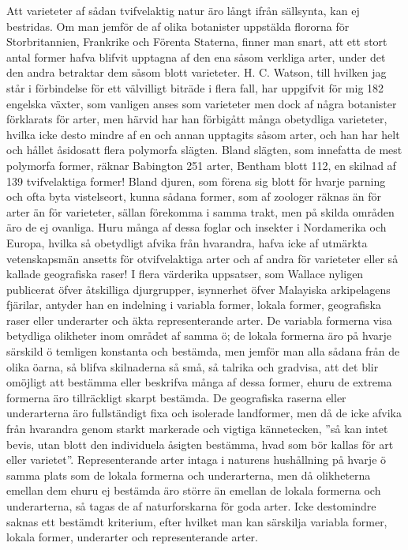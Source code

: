 Att varieteter af sådan tvifvelaktig natur äro långt ifrån sällsynta, kan ej bestridas. Om man jemför de af olika botanister uppstälda flororna för Storbritannien, Frankrike och Förenta Staterna, finner man snart, att ett stort antal former hafva blifvit upptagna af den ena såsom verkliga arter, under det den andra betraktar dem såsom blott varieteter. H. C. Watson, till hvilken jag står i förbindelse för ett välvilligt biträde i flera fall, har uppgifvit för mig 182 engelska växter, som vanligen anses som varieteter men dock af några botanister förklarats för arter, men härvid har han förbigått många obetydliga varieteter, hvilka icke desto mindre af en och annan upptagits såsom arter, och han har helt och hållet åsidosatt flera polymorfa slägten. Bland slägten, som innefatta de mest polymorfa former, räknar Babington 251 arter, Bentham blott 112, en skilnad af 139 tvifvelaktiga former! Bland djuren, som förena sig blott för hvarje parning och ofta byta vistelseort, kunna sådana former, som af zoologer räknas än för arter än för varieteter, sällan förekomma i samma trakt, men på skilda områden äro de ej ovanliga. Huru många af dessa foglar och insekter i Nordamerika och Europa, hvilka så obetydligt afvika från hvarandra, hafva icke af utmärkta vetenskapsmän ansetts för otvifvelaktiga arter och af andra för varieteter eller så kallade geografiska raser! I flera värderika uppsatser, som Wallace nyligen publicerat öfver åtskilliga djurgrupper, isynnerhet öfver Malayiska arkipelagens fjärilar, antyder han en indelning i variabla former, lokala former, geografiska raser eller underarter och äkta representerande arter. De variabla formerna visa betydliga olikheter inom området af samma ö; de lokala formerna äro på hvarje särskild ö temligen konstanta och bestämda, men jemför man alla sådana från de olika öarna, så blifva skilnaderna så små, så talrika och gradvisa, att det blir omöjligt att bestämma eller beskrifva många af dessa former, ehuru de extrema formerna äro tillräckligt skarpt bestämda. De geografiska raserna eller underarterna äro fullständigt fixa och isolerade landformer, men då de icke afvika från hvarandra genom starkt markerade och vigtiga kännetecken, ”så kan intet bevis, utan blott den individuela åsigten bestämma, hvad som bör kallas för art eller varietet”. Representerande arter intaga i naturens hushållning på hvarje ö samma plats som de lokala formerna och underarterna, men då olikheterna emellan dem ehuru ej bestämda äro större än emellan de lokala formerna och underarterna, så tagas de af naturforskarna för goda arter. Icke destomindre saknas ett bestämdt kriterium, efter hvilket man kan särskilja variabla former, lokala former, underarter och representerande arter.

